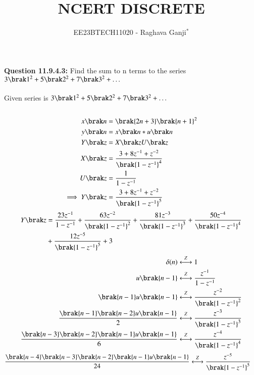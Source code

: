 \documentclass[journal,12pt,twocolumn]{IEEEtran}
\theoremstyle{remark}
\begin{document}

\vspace{3cm}

\title{NCERT DISCRETE}
\author{EE23BTECH11020 - Raghava Ganji$^{*}$%
}
\maketitle
\newpage
\bigskip

\renewcommand{\thefigure}{\theenumi}
\renewcommand{\thetable}{\theenumi}
\textbf{Question 11.9.4.3:}
Find the sum to n terms to the series $3\brak 1^2+5\brak 2^2+7\brak 3^2+ \ldots$\\ 
\solution\\
Given series is $3\brak 1^2+5\brak 2^2+7\brak 3^2+ \ldots$\\\\

\begin{align}
x\brak n&=\brak{2n+3}\brak{n+1}^2\\
y\brak n&=x\brak n*u\brak n\\
Y\brak z&=X\brak zU\brak z\\
X\brak z&=\frac{3+8z^{-1}+z^{-2}}{\brak{1-z^{-1}}^4}\\
U\brak z&=\frac{1}{1-z^{-1}}\\
\implies Y\brak z&=\frac{3+8z^{-1}+z^{-2}}{\brak{1-z^{-1}}^5}
\end{align}
\begin{align}
\notag Y\brak z&=\frac{23z^{-1}}{1-z^{-1}}+\frac{63z^{-2}}{\brak{1-z^{-1}}^2}+\frac{81z^{-3}}{\brak{1-z^{-1}}^3}+\frac{50z^{-4}}{\brak{1-z^{-1}}^4}\\&+\frac{12z^{-5}}{\brak{1-z^{-1}}^5}+3
\end{align}
\begin{align}
\delta (n) &\overset{Z}\longleftrightarrow 1\\
u \brak {n-1}&\overset{Z}\longleftrightarrow\frac{z^{-1}}{1-z^{-1}}\\
\brak{n-1}u\brak{n-1}&\overset{Z}\longleftrightarrow\frac{z^{-2}}{\brak{1-z^{-1}}^2}\\
\frac{\brak{n-1}\brak{n-2}u\brak{n-1}}{2}&\overset{Z}\longleftrightarrow\frac{z^{-3}}{\brak{1-z^{-1}}^3}\\
\frac{\brak{n-3}\brak{n-2}\brak{n-1}u\brak{n-1}}{6}&\overset{Z}\longleftrightarrow\frac{z^{-4}}{\brak{1-z^{-1}}^4}
\end{align}
\begin{align}
\frac{\brak{n-4}\brak{n-3}\brak{n-2}\brak{n-1}u\brak{n-1}}{24}&\overset{Z}\longleftrightarrow\frac{z^{-5}}{\brak{1-z^{-1}}^5}
\end{align}
\end{document}
